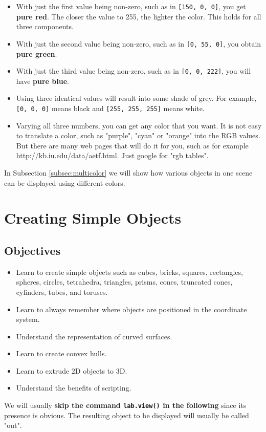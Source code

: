 \documentclass{article}
\begin{document}
\begin{itemize}
\item With just the first value being non-zero, such as in {\tt [150, 0, 0]},
      you get {\bf pure red}. The closer the value to 255, the lighter the color.
      This holds for all three components.
\item With just the second value being non-zero, such as in {\tt [0, 55, 0]},
      you obtain {\bf pure green}.
\item With just the third value being non-zero, such as in {\tt [0, 0, 222]},
      you will have {\bf pure blue}. 
\item Using three identical values will result into some shade of grey. For 
      example, {\tt [0, 0, 0]}
      means black and {\tt [255, 255, 255]} means white.
\item Varying all three numbers, you can get any color that you want. It is not 
      easy to translate a color, such as "purple", "cyan" or "orange" into the RGB
      values. But there are many web pages that will do it for you, such as for
      example http://kb.iu.edu/data/aetf.html. Just google for "rgb tables".
\end{itemize}
In Subsection \ref{subsec:multicolor} we will show how various objects in
one scene can be displayed using different colors.

\section{Creating Simple Objects}

\subsection{Objectives}
\begin{itemize}
\item Learn to create simple objects such as cubes, bricks, squares, rectangles, spheres, circles, 
      tetrahedra, triangles, prisms, cones, truncated cones, 
      cylinders, tubes, and toruses. 
\item Learn to always remember where objects are positioned in the coordinate system.
\item Understand the representation of curved surfaces.
\item Learn to create convex hulls.
\item Learn to extrude 2D objects to 3D.
\item Understand the benefits of scripting.
\end{itemize}
We will usually {\bf skip the command
{\tt lab.view()} in the following} since its presence is obvious.
The resulting object to be displayed will usually be called "out".
\end{document}
